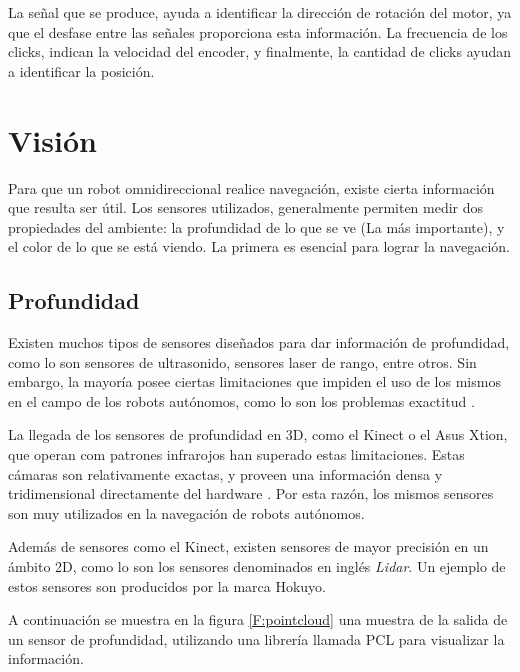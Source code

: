 La señal que se produce, ayuda a identificar la dirección de rotación del motor, ya que el desfase entre las señales proporciona esta información. La frecuencia de los clicks, indican la velocidad del encoder, y finalmente, la cantidad de clicks ayudan a identificar la posición.

\section{Visión}
Para que un robot omnidireccional realice navegación, existe cierta información que resulta ser útil. Los sensores utilizados, generalmente permiten medir dos propiedades del ambiente: la profundidad de lo que se ve (La más importante), y el color de lo que se está viendo. La primera es esencial para lograr la navegación.

\subsection{Profundidad}
Existen muchos tipos de sensores diseñados para dar información de profundidad, como lo son sensores de ultrasonido, sensores laser de rango, entre otros. Sin embargo, la mayoría posee ciertas limitaciones que impiden el uso de los mismos en el campo de los robots autónomos, como lo son los problemas exactitud \cite{DanielMaierArminHornung2012}.

La llegada de los sensores de profundidad en 3D, como el Kinect o el Asus Xtion, que operan com patrones infrarojos han superado estas limitaciones. Estas cámaras son relativamente exactas, y proveen una información densa y tridimensional directamente del hardware \cite{DanielMaierArminHornung2012}. Por esta razón, los mismos sensores son muy utilizados en la navegación de robots autónomos.

Además de sensores como el Kinect, existen sensores de mayor precisión en un ámbito 2D, como lo son los sensores denominados en inglés \textit{Lidar}. Un ejemplo de estos sensores son producidos por la marca Hokuyo.

A continuación se muestra en la figura \ref{F:pointcloud} una muestra de la salida de un sensor de profundidad, utilizando una librería llamada PCL para visualizar la información.

